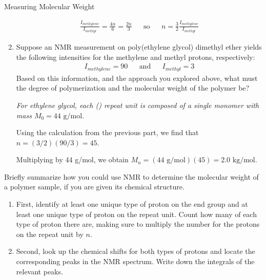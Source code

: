 \begin{activity}{Measuring Molecular Weight}
\begin{ctqs}
\begin{enumerate}
				\begin{solution}[1.25in]
					\begin{align*}
						\frac{I_{methylene}}{I_{methyl}} = \frac{4n}{6}=\frac{2n}{3} && \text{so} && n = \frac{3}{2}\frac{I_{methylene}}{I_{methyl}}
					\end{align*}
				\end{solution}
				
			\item Suppose an NMR measurement on poly(ethylene glycol) dimethyl ether yields the following intensities for the methylene and methyl protons, respectively:
				\begin{align*}
					I_{methylene}=90 && \text{and} &&
					I_{methyl}=3
				\end{align*}
				Based on this information, and the approach you explored above, what must the degree of polymerization and the molecular weight of the polymer be?
				
				\emph{For ethylene glycol, each () repeat unit is composed of a single monomer with mass $M_0=44\text{ g/mol}$.}
				
				\begin{solution}[1.5in]
					Using the calculation from the previous part, we find that $n = (3/2)(90/3) = 45$.
					
					Multiplying by 44 g/mol, we obtain $M_n = (44\text{ g/mol})(45) = 2.0\text{ kg/mol}$.
				\end{solution}
				
		\end{enumerate}
		
		\question Briefly summarize how you could use NMR to determine the molecular weight of a polymer sample, if you are given its chemical structure.
		
			\begin{solution}[2in]
			
				\begin{enumerate}				
					\item First, identify at least one unique type of proton on the end group and at least one unique type of proton on the repeat unit.  Count how many of each type of proton there are, making sure to multiply the number for the protons on the repeat unit by $n$.
				
					\item Second, look up the chemical shifts for both types of protons and locate the corresponding peaks in the NMR spectrum.  Write down the integrals of the relevant peaks.
				

\end{enumerate}
\end{solution}
\end{ctqs}
\end{activity}
